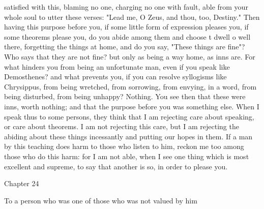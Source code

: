 \documentclass[a4paper]{article}
\begin{document}
satisfied with this, blaming no one, charging no one with fault, able from your
whole soul to utter these verses:
       "Lead me, O Zeus, and thou, too, Destiny."
Then having this purpose before you, if some little form of expression pleases
you, if some theorems please you, do you abide among them and choose t dwell o
well there, forgetting the things at home, and do you say, "These things are
fine"? Who says that they are not fine? but only as being a way home, as inns
are. For what hinders you from being an unfortunate man, even if you speak like
Demosthenes? and what prevents you, if you can resolve syllogisms like
Chrysippus, from being wretched, from sorrowing, from envying, in a word, from
being disturbed, from being unhappy? Nothing. You see then that these were
inns, worth nothing; and that the purpose before you was something else. When I
speak thus to some persons, they think that I am rejecting care about speaking,
or care about theorems. I am not rejecting this care, but I am rejecting the
abiding about these things incessantly and putting our hopes in them. If a man
by this teaching does harm to those who listen to him, reckon me too among
those who do this harm: for I am not able, when I see one thing which is most
excellent and supreme, to say that another is so, in order to please you.

Chapter 24

To a person who was one of those who was not valued by him
\end{document}
